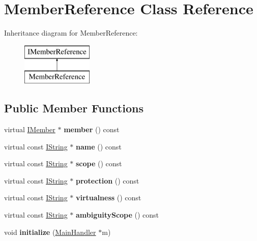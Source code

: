 \hypertarget{class_member_reference}{}\section{Member\+Reference Class Reference}
\label{class_member_reference}
Inheritance diagram for Member\+Reference\+:\begin{figure}[H]
\begin{center}
\leavevmode
\includegraphics[height=2.000000cm]{class_member_reference}
\end{center}
\end{figure}
\subsection*{Public Member Functions}
\begin{DoxyCompactItemize}
\item 
\mbox{\label{class_member_reference_a112f34f3f99cbdfa660f0b0a80ed8e2b}} 
virtual \mbox{\hyperlink{class_i_member}{I\+Member}} $\ast$ {\bfseries member} () const
\item 
\mbox{\label{class_member_reference_a85ef08a46b3bb1c1e8ef5108c1b14871}} 
virtual const \mbox{\hyperlink{class_i_string}{I\+String}} $\ast$ {\bfseries name} () const
\item 
\mbox{\label{class_member_reference_aeb76f05795551f7d8041b8f33162ccf5}} 
virtual const \mbox{\hyperlink{class_i_string}{I\+String}} $\ast$ {\bfseries scope} () const
\item 
\mbox{\label{class_member_reference_afead8f2fe9eea72282a426263a8d853d}} 
virtual const \mbox{\hyperlink{class_i_string}{I\+String}} $\ast$ {\bfseries protection} () const
\item 
\mbox{\label{class_member_reference_a0c9945e884c697442bbb1e347d9991e1}} 
virtual const \mbox{\hyperlink{class_i_string}{I\+String}} $\ast$ {\bfseries virtualness} () const
\item 
\mbox{\label{class_member_reference_a895f1561b662c2b45c80c32ef3f3f3c6}} 
virtual const \mbox{\hyperlink{class_i_string}{I\+String}} $\ast$ {\bfseries ambiguity\+Scope} () const
\item 
\mbox{\label{class_member_reference_ac82f336309ab47218a87fec5ea8fc68c}} 
void {\bfseries initialize} (\mbox{\hyperlink{class_main_handler}{Main\+Handler}} $\ast$m)
\end{DoxyCompactItemize}
